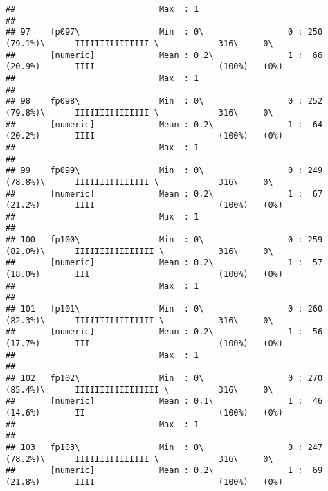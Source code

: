 \documentclass[]{article}
\begin{document}
\begin{verbatim}
##                             Max  : 1                                                                                       
## 
## 97    fp097\                Min  : 0\                 0 : 250 (79.1%)\      IIIIIIIIIIIIIII \            316\     0\       
##       [numeric]             Mean : 0.2\               1 :  66 (20.9%)       IIII                         (100%)   (0%)     
##                             Max  : 1                                                                                       
## 
## 98    fp098\                Min  : 0\                 0 : 252 (79.8%)\      IIIIIIIIIIIIIII \            316\     0\       
##       [numeric]             Mean : 0.2\               1 :  64 (20.2%)       IIII                         (100%)   (0%)     
##                             Max  : 1                                                                                       
## 
## 99    fp099\                Min  : 0\                 0 : 249 (78.8%)\      IIIIIIIIIIIIIII \            316\     0\       
##       [numeric]             Mean : 0.2\               1 :  67 (21.2%)       IIII                         (100%)   (0%)     
##                             Max  : 1                                                                                       
## 
## 100   fp100\                Min  : 0\                 0 : 259 (82.0%)\      IIIIIIIIIIIIIIII \           316\     0\       
##       [numeric]             Mean : 0.2\               1 :  57 (18.0%)       III                          (100%)   (0%)     
##                             Max  : 1                                                                                       
## 
## 101   fp101\                Min  : 0\                 0 : 260 (82.3%)\      IIIIIIIIIIIIIIII \           316\     0\       
##       [numeric]             Mean : 0.2\               1 :  56 (17.7%)       III                          (100%)   (0%)     
##                             Max  : 1                                                                                       
## 
## 102   fp102\                Min  : 0\                 0 : 270 (85.4%)\      IIIIIIIIIIIIIIIII \          316\     0\       
##       [numeric]             Mean : 0.1\               1 :  46 (14.6%)       II                           (100%)   (0%)     
##                             Max  : 1                                                                                       
## 
## 103   fp103\                Min  : 0\                 0 : 247 (78.2%)\      IIIIIIIIIIIIIII \            316\     0\       
##       [numeric]             Mean : 0.2\               1 :  69 (21.8%)       IIII                         (100%)   (0%)     

\end{verbatim}
\end{document}
